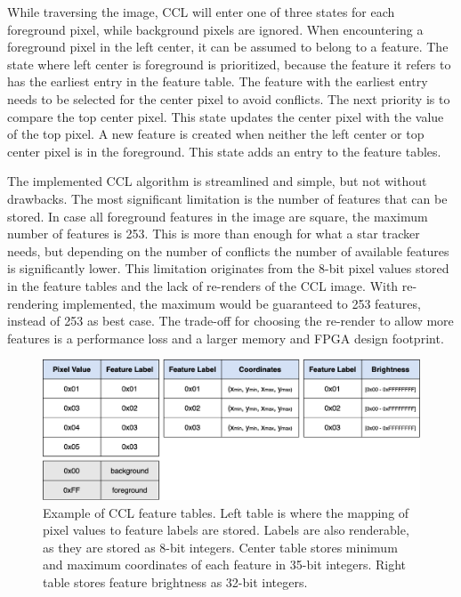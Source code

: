 \documentclass[12pt]{report}
\begin{document}
\par
While traversing the image, CCL will enter one of three states for each foreground pixel, while background pixels are ignored. When encountering a foreground pixel in the left center, it can be assumed to belong to a feature. The state where left center is foreground is prioritized, because the feature it refers to has the earliest entry in the feature table. The feature with the earliest entry needs to be selected for the center pixel to avoid conflicts. The next priority is to compare the top center pixel. This state updates the center pixel with the value of the top pixel. A new feature is created when neither the left center or top center pixel is in the foreground. This state adds an entry to the feature tables.
\par
The implemented CCL algorithm is streamlined and simple, but not without drawbacks. The most significant limitation is the number of features that can be stored. In case all foreground features in the image are square, the maximum number of features is 253. This is more than enough for what a star tracker needs, but depending on the number of conflicts the number of available features is significantly lower. This limitation originates from the 8-bit pixel values stored in the feature tables and the lack of re-renders of the CCL image. With re-rendering implemented, the maximum would be guaranteed to 253 features, instead of 253 as best case. The trade-off for choosing the re-render to allow more features is a performance loss and a larger memory and FPGA design footprint.

\begin{figure}[h]
    \centering
    \includegraphics[scale=0.35]{figures/feature_tables.png}
    \caption{Example of CCL feature tables. Left table is where the mapping of pixel values to feature labels are stored. Labels are also renderable, as they are stored as 8-bit integers. Center table stores minimum and maximum coordinates of each feature in 35-bit integers. Right table stores feature brightness as 32-bit integers.}
    \label{fig:feature_tables}
\end{figure}
\end{document}
